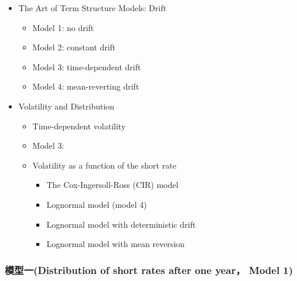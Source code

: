 \begin{itemize}
\item The Art of Term Structure Models: Drift
    \begin{itemize}
    \item Model 1: no drift
    \item Model 2: constant drift
    \item Model 3: time-dependent drift
    \item Model 4: mean-reverting drift
    \end{itemize}

\item Volatility and Distribution
    \begin{itemize}
    \item Time-dependent volatility
    \item Model 3: 
    \item Volatility as a function of the short rate
        \begin{itemize}
        \item The Cox-Ingersoll-Ross (CIR) model
        \item Lognormal model (model 4)
        \item Lognormal model with deterministic drift
        \item Lognormal model with mean reversion
        \end{itemize}
    \end{itemize}
\end{itemize}



\subsubsection{    \textbf{模型一(Distribution of short rates after one year， Model 1)}}



